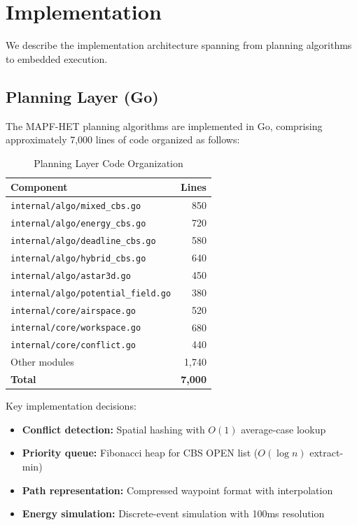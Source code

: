 \section{Implementation}
\label{sec:implementation}

We describe the implementation architecture spanning from planning algorithms to embedded execution.

\subsection{Planning Layer (Go)}

The MAPF-HET planning algorithms are implemented in Go, comprising approximately 7,000 lines of code organized as follows:

\begin{table}[htbp]
\centering
\caption{Planning Layer Code Organization}
\label{tab:code}
\begin{tabular}{@{}lr@{}}
\toprule
Component & Lines \\
\midrule
\texttt{internal/algo/mixed\_cbs.go} & 850 \\
\texttt{internal/algo/energy\_cbs.go} & 720 \\
\texttt{internal/algo/deadline\_cbs.go} & 580 \\
\texttt{internal/algo/hybrid\_cbs.go} & 640 \\
\texttt{internal/algo/astar3d.go} & 450 \\
\texttt{internal/algo/potential\_field.go} & 380 \\
\texttt{internal/core/airspace.go} & 520 \\
\texttt{internal/core/workspace.go} & 680 \\
\texttt{internal/core/conflict.go} & 440 \\
Other modules & 1,740 \\
\midrule
\textbf{Total} & \textbf{7,000} \\
\bottomrule
\end{tabular}
\end{table}

Key implementation decisions:
\begin{itemize}
    \item \textbf{Conflict detection:} Spatial hashing with $O(1)$ average-case lookup
    \item \textbf{Priority queue:} Fibonacci heap for CBS OPEN list ($O(\log n)$ extract-min)
    \item \textbf{Path representation:} Compressed waypoint format with interpolation
    \item \textbf{Energy simulation:} Discrete-event simulation with 100ms resolution
\end{itemize}

